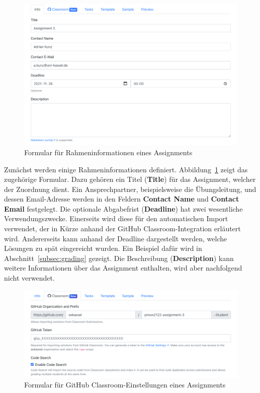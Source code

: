 \begin{figure}
    \centering
    \includegraphics[width=\textwidth]{images/assignment-create-info}
    \caption{Formular für Rahmeninformationen eines Assignments}
    \label{fig:assignment-create-info}
\end{figure}

Zunächst werden einige Rahmeninformationen definiert.
Abbildung~\ref{fig:assignment-create-info} zeigt das zugehörige Formular.
Dazu gehören ein Titel (\textbf{Title}) für das Assignment, welcher der Zuordnung dient.
Ein Ansprechpartner, beispielsweise die Übungsleitung, und dessen Email-Adresse werden in den Feldern \textbf{Contact Name} und \textbf{Contact Email} festgelegt.
Die optionale Abgabefrist (\textbf{Deadline}) hat zwei wesentliche Verwendungszwecke.
Einerseits wird diese für den automatischen Import verwendet, der in Kürze anhand der GitHub Classroom-Integration erläutert wird.
Andererseits kann anhand der Deadline dargestellt werden, welche Lösungen zu spät eingereicht wurden.
Ein Beispiel dafür wird in Abschnitt~\ref{subsec:grading} gezeigt.
Die Beschreibung (\textbf{Description}) kann weitere Informationen über das Assignment enthalten, wird aber nachfolgend nicht verwendet.

\begin{figure}
    \centering
    \includegraphics[width=\textwidth]{images/assignment-create-classroom}
    \caption{Formular für GitHub Classroom-Einstellungen eines Assignments}
    \label{fig:assignment-create-classroom}
\end{figure}

